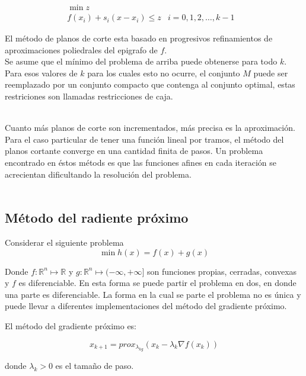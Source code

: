\begin{eqnarray*}
   \min z & & \\
   f(x_i) + s_i(x - x_i) \leqslant z & i = 0, 1, 2, \ldots , k-1 & 
\end{eqnarray*}

El m\'etodo de planos de corte esta basado en progresivos refinamientos de aproximaciones poliedrales del epigrafo de $f.$\\ %
Se asume que el m\'inimo del problema de arriba puede obtenerse para todo $k. $ Para esos valores de $k $ para los cuales esto no ocurre, el 
conjunto $M $ puede ser reemplazado por un conjunto compacto que contenga al conjunto optimal, estas restriciones son llamadas restricciones
de caja.\\ \

Cuanto m\'as planos de corte son incrementados, m\'as precisa es la aproximaci\'on. Para el caso particular de tener una funci\'on lineal por
tramos, el m\'etodo del planos cortante converge en una cantidad finita de pasos. Un problema encontrado en \'estos m\'etods es que las 
funciones afines en cada iteraci\'on se acrecientan dificultando la resoluci\'on del problema.%
\\ \\

\subsection{M\'etodo del radiente pr\'oximo \cite{intro}}

Considerar el siguiente problema \[\min h(x) = f(x) + g(x)\]

Donde $f:\mathbb{R}^n \longmapsto \mathbb{R} $ y $ g: \mathbb{R}^n \longmapsto (-\infty, +\infty] $ son funciones propias, cerradas, convexas
y $ f $ es diferenciable. En esta forma se puede partir el problema en dos, en donde una parte es diferenciable. La forma en la cual se parte 
el problema no es \'unica y puede llevar a diferentes implementaciones del m\'etodo del gradiente pr\'oximo.\medskip

El m\'etodo del gradiente pr\'oximo es:


\begin{equation*}
   x_{k+1} = prox_{\lambda_{kg}}(x_k - \lambda_k \nabla f(x_k))
\end{equation*}

donde $\lambda_k > 0 $ es el tama\~no de paso.\\

















